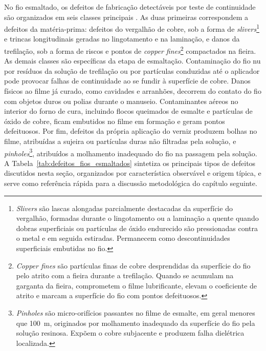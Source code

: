 No fio esmaltado, os defeitos de fabricação detectáveis por teste de continuidade são organizados em seis classes principais \cite{demiri2014enamel}. As duas primeiras correspondem a defeitos da matéria-prima: defeitos do vergalhão de cobre, sob a forma de \emph{slivers}\footnote{\emph{Slivers} são lascas alongadas parcialmente destacadas da superfície do vergalhão, formadas durante o lingotamento ou a laminação a quente quando dobras superficiais ou partículas de óxido endurecido são pressionadas contra o metal e em seguida estiradas. Permanecem como descontinuidades superficiais embutidas no fio.} e trincas longitudinais geradas no lingotamento e na laminação, e danos da trefilação, sob a forma de riscos e pontos de \emph{copper fines}\footnote{\emph{Copper fines} são partículas finas de cobre desprendidas da superfície do fio pelo atrito com a fieira durante a trefilação. Quando se acumulam na garganta da fieira, comprometem o filme lubrificante, elevam o coeficiente de atrito e marcam a superfície do fio com pontos defeituosos.} compactados na fieira. As demais classes são específicas da etapa de esmaltação. Contaminação do fio nu por resíduos da solução de trefilação ou por partículas conduzidas até o aplicador pode provocar falhas de continuidade ao se fundir à superfície de cobre. Danos físicos ao filme já curado, como cavidades e arranhões, decorrem do contato do fio com objetos duros ou polias durante o manuseio. Contaminantes aéreos no interior do forno de cura, incluindo flocos queimados de esmalte e partículas de óxido de cobre, ficam embutidos no filme em formação e geram pontos defeituosos. Por fim, defeitos da própria aplicação do verniz produzem bolhas no filme, atribuídas a sujeira ou partículas duras não filtradas pela solução, e \emph{pinholes}\footnote{\emph{Pinholes} são micro-orifícios passantes no filme de esmalte, em geral menores que 100~\textmu m, originados por molhamento inadequado da superfície do fio pela solução resinosa. Expõem o cobre subjacente e produzem falha dielétrica localizada.}, atribuídos a molhamento inadequado do fio na passagem pela solução. A Tabela~\ref{tab:defeitos_fios_esmaltados} sintetiza os principais tipos de defeitos discutidos nesta seção, organizados por característica observável e origem típica, e serve como referência rápida para a discussão metodológica do capítulo seguinte.


